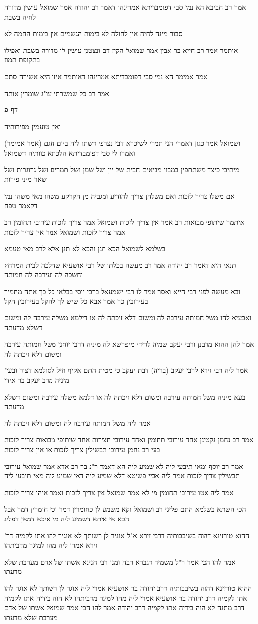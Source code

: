 \documentclass[12pt, openany]{book}
\newcommand{\sethebfont}{
\fontsize{10.5pt}{21.0pt} \selectfont
}
\newcommand{\textblock}[1]{
{\sethebfont #1\\}	
}
\newcommand{\sectname}{}
\newcommand{\newsection}[1]{
	\addcontentsline{toc}{section}{#1}
	\renewcommand{\sectname}{#1}	
	\vspace{-\baselineskip}
	\begin{center}
		\textbf{%
\fontsize{16pt}{16pt}\selectfont
			#1}
	\end{center}
	\vspace{-\baselineskip}
	\nopagebreak
}
\begin{document}
\textblock{אמר רב חביבא הא נמי סבי דפומבדיתא אמרינהו דאמר רב יהודה אמר שמואל עושין מדורה לחיה בשבת}
\textblock{סבור מינה לחיה אין לחולה לא בימות הגשמים אין בימות החמה לא}
\textblock{איתמר אמר רב חייא בר אבין אמר שמואל הקיז דם ונצטנן עושין לו מדורה בשבת ואפילו בתקופת תמוז}
\textblock{אמר אמימר הא נמי סבי דפומבדיתא אמרינהו דאיתמר איזו היא אשירה סתם}
\textblock{אמר רב כל שמשרתי עו"ג שומרין אותה}
\newsection{דף פ}
\textblock{ואין טועמין מפירותיה}
\textblock{ושמואל אמר כגון דאמרי הני תמרי לשיכרא דבי נצרפי דשתו ליה ביום חגם (אמר אמימר) ואמרו לי סבי דפומבדיתא הלכתא כוותיה דשמואל}
\textblock{מיתיבי כיצד משתתפין במבוי מביאים חבית של יין ושל שמן ושל תמרים ושל גרוגרות ושל שאר מיני פירות}
\textblock{אם משלו צריך לזכות ואם משלהן צריך להודיע ומגביה מן הקרקע משהו מאי משהו נמי דקאמר טפח}
\textblock{איתמר שיתופי מבואות רב אמר אין צריך לזכות ושמואל אמר צריך לזכות עירובי תחומין רב אמר צריך לזכות ושמואל אמר אין צריך לזכות}
\textblock{בשלמא לשמואל הכא תנן והכא לא תנן אלא לרב מאי טעמא}
\textblock{תנאי היא דאמר רב יהודה אמר רב מעשה בכלתו של רבי אושעיא שהלכה לבית המרחץ וחשכה לה ועירבה לה חמותה}
\textblock{ובא מעשה לפני רבי חייא ואסר אמר לו רבי ישמעאל ברבי יוסי בבלאי כל כך אתה מחמיר בעירובין כך אמר אבא כל שיש לך להקל בעירובין הקל}
\textblock{ואבעיא להו משל חמותה עירבה לה ומשום דלא זיכתה לה או דילמא משלה עירבה לה ומשום דשלא מדעתה}
\textblock{אמר להן ההוא מרבנן ורבי יעקב שמיה לדידי מיפרשא לה מיניה דרבי יוחנן משל חמותה עירבה ומשום דלא זיכתה לה}
\textblock{אמר ליה רבי זירא לרבי יעקב (בריה) דבת יעקב כי מטית התם אקיף וזיל לסולמא דצור ובעי' מיניה מרב יעקב בר אידי}
\textblock{בעא מיניה משל חמותה עירבה ומשום דלא זיכתה לה או דלמא משלה עירבה ומשום דשלא מדעתה}
\textblock{אמר ליה משל חמותה עירבה לה ומשום דלא זיכתה לה}
\textblock{אמר רב נחמן נקטינן אחד עירובי תחומין ואחד עירובי חצירות אחד שיתופי מבואות צריך לזכות בעי רב נחמן עירובי תבשילין צריך לזכות או אין צריך לזכות}
\textblock{אמר רב יוסף ומאי תיבעי ליה לא שמיע ליה הא דאמר ר"נ בר רב אדא אמר שמואל עירובי תבשילין צריך לזכות אמר ליה אביי פשיטא דלא שמיע ליה דאי שמיע ליה מאי תיבעי ליה}
\textblock{אמר ליה אטו עירובי תחומין מי לא אמר שמואל אין צריך לזכות ואמר איהו צריך לזכות}
\textblock{הכי השתא בשלמא התם פליגי רב ושמואל וקא משמע לן כחומרין דמר וכי חומרין דמר אבל הכא אי איתא דשמיע ליה מי איכא דמאן דפליג}
\textblock{ההוא טורזינא דהוה בשיבבותיה דרבי זירא א"ל אוגיר לן רשותך לא אוגיר להו אתו לקמיה דר' זירא אמרו ליה מהו למיגר מדביתהו}
\textblock{אמר להו הכי אמר ר"ל משמיה דגברא רבה ומנו רבי חנינא אשתו של אדם מערבת שלא מדעתו}
\textblock{ההוא טורזינא דהוה בשיבבותיה דרב יהודה בר אושעיא אמרי ליה אוגר לן רשותך לא אוגר להו אתו לקמיה דרב יהודה בר אושעיא אמרי ליה מהו למיגר מדביתהו לא הוה בידיה אתו לקמיה דרב מתנה לא הוה בידיה אתו לקמיה דרב יהודה אמר להו הכי אמר שמואל אשתו של אדם מערבת שלא מדעתו}
\end{document}

